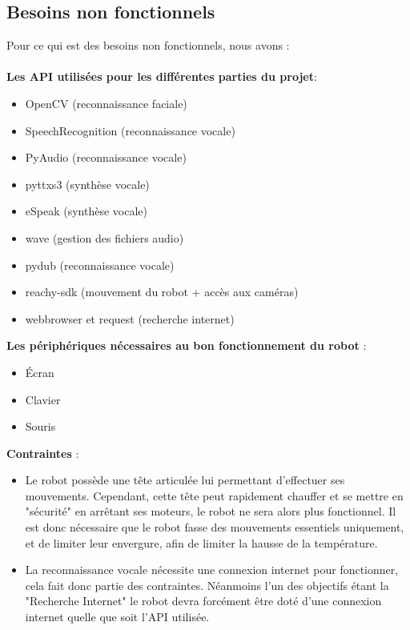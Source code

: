 \subsection{Besoins non fonctionnels}
Pour ce qui est des besoins non fonctionnels, nous avons : \\ \\
\textbf{Les API utilisées pour les différentes parties du projet}:
\begin{itemize}
    \item OpenCV (reconnaissance faciale)
    \item SpeechRecognition (reconnaissance vocale)
    \item PyAudio  (reconnaissance vocale)
    \item pyttxs3 (synthèse vocale)
    \item eSpeak (synthèse vocale)
    \item wave (gestion des fichiers audio)
    \item pydub (reconnaissance vocale)
    \item reachy-sdk (mouvement du robot + accès aux caméras)
    \item webbrowser et request (recherche internet) \\
\end{itemize}
\textbf{Les périphériques nécessaires au bon fonctionnement du robot }:
\begin{itemize}
    \item Écran
    \item Clavier
    \item Souris \\
\end{itemize}    
\textbf{Contraintes} :
\begin{itemize}
    \item Le robot possède une tête articulée lui permettant d'effectuer ses mouvements. Cependant, cette tête peut rapidement chauffer et se mettre en "sécurité" en arrêtant ses moteurs, le robot ne sera alors plus fonctionnel. Il est donc nécessaire que le robot fasse des mouvements essentiels uniquement, et de limiter leur envergure, afin de limiter la hausse de la température.
    \item La reconnaissance vocale nécessite une connexion internet pour fonctionner, cela fait donc partie des contraintes. Néanmoins l'un des objectifs étant la "Recherche Internet" le robot devra forcément être doté d'une connexion internet quelle que soit l'API utilisée.
\end{itemize}

